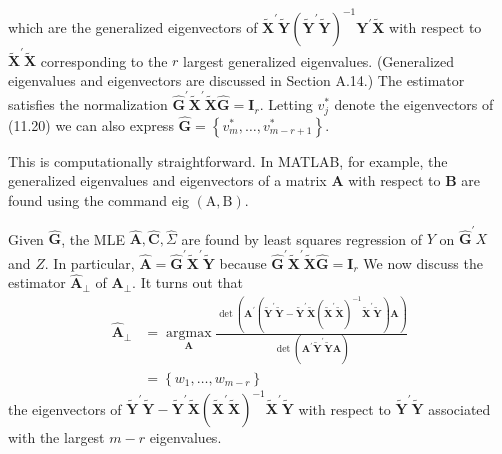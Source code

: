 \documentclass[10pt]{article}
\begin{document}
which are the generalized eigenvectors of $\widetilde{\boldsymbol{X}}^{\prime} \tilde{\boldsymbol{Y}}\left(\tilde{\boldsymbol{Y}}^{\prime} \tilde{\boldsymbol{Y}}\right)^{-1} \boldsymbol{Y}^{\prime} \tilde{\boldsymbol{X}}$ with respect to $\widetilde{\boldsymbol{X}}^{\prime} \widetilde{\boldsymbol{X}}$ corresponding to the $r$ largest generalized eigenvalues. (Generalized eigenvalues and eigenvectors are discussed in Section A.14.) The estimator satisfies the normalization $\widehat{\boldsymbol{G}}^{\prime} \widetilde{\boldsymbol{X}}^{\prime} \widetilde{\boldsymbol{X}} \widehat{\boldsymbol{G}}=\boldsymbol{I}_{r}$. Letting $v_{j}^{*}$ denote the eigenvectors of (11.20) we can also express $\widehat{\boldsymbol{G}}=\left\{v_{m}^{*}, \ldots, v_{m-r+1}^{*}\right\}$.

This is computationally straightforward. In MATLAB, for example, the generalized eigenvalues and eigenvectors of a matrix $\boldsymbol{A}$ with respect to $\boldsymbol{B}$ are found using the command eig $(\mathrm{A}, \mathrm{B})$.

Given $\widehat{\boldsymbol{G}}$, the MLE $\widehat{\boldsymbol{A}}, \widehat{\boldsymbol{C}}, \widehat{\Sigma}$ are found by least squares regression of $Y$ on $\widehat{\boldsymbol{G}}^{\prime} X$ and $Z$. In particular, $\widehat{\boldsymbol{A}}=\widehat{\boldsymbol{G}}^{\prime} \widetilde{\boldsymbol{X}}^{\prime} \tilde{\boldsymbol{Y}}$ because $\widehat{\boldsymbol{G}}^{\prime} \widetilde{\boldsymbol{X}}^{\prime} \widetilde{\boldsymbol{X}} \widehat{\boldsymbol{G}}=\boldsymbol{I}_{r}$ We now discuss the estimator $\widehat{\boldsymbol{A}}_{\perp}$ of $\boldsymbol{A}_{\perp}$. It turns out that
$$
\begin{aligned}
\widehat{\boldsymbol{A}}_{\perp} &=\underset{\boldsymbol{A}}{\operatorname{argmax}} \frac{\operatorname{det}\left(\boldsymbol{A}^{\prime}\left(\tilde{\boldsymbol{Y}}^{\prime} \tilde{\boldsymbol{Y}}-\tilde{\boldsymbol{Y}}^{\prime} \tilde{\boldsymbol{X}}\left(\tilde{\boldsymbol{X}}^{\prime} \tilde{\boldsymbol{X}}\right)^{-1} \widetilde{\boldsymbol{X}}^{\prime} \tilde{\boldsymbol{Y}}\right) \boldsymbol{A}\right)}{\operatorname{det}\left(\boldsymbol{A}^{\prime} \tilde{\boldsymbol{Y}}^{\prime} \tilde{\boldsymbol{Y}} \boldsymbol{A}\right)} \\
&=\left\{w_{1}, \ldots, w_{m-r}\right\}
\end{aligned}
$$
the eigenvectors of $\tilde{\boldsymbol{Y}}^{\prime} \tilde{\boldsymbol{Y}}-\tilde{\boldsymbol{Y}}^{\prime} \tilde{\boldsymbol{X}}\left(\tilde{\boldsymbol{X}}^{\prime} \tilde{\boldsymbol{X}}\right)^{-1} \tilde{\boldsymbol{X}}^{\prime} \tilde{\boldsymbol{Y}}$ with respect to $\tilde{\boldsymbol{Y}}^{\prime} \tilde{\boldsymbol{Y}}$ associated with the largest $m-r$ eigenvalues.
\end{document}
